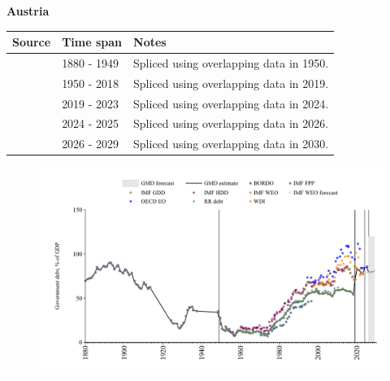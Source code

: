 \documentclass[12pt,a4paper,landscape]{article}
\begin{document}
\begin{adjustbox}{max totalsize={\paperwidth}{\paperheight},center}
\begin{minipage}[t][\textheight][t]{\textwidth}
\vspace*{0.5cm}
{}
\begin{center}
{\Large\bfseries Austria}
\end{center}
\vspace{0.5cm}
\begin{table}[H]
\centering
\small
\begin{tabular}{|l|l|l|}
\hline
\textbf{Source} & \textbf{Time span} & \textbf{Notes} \\
\hline
\rowcolor{white}\cite{IMF_FPP}& 1880 - 1949 &Spliced using overlapping data in 1950.\\
\rowcolor{lightgray}\cite{IMF_GDD}& 1950 - 2018 &Spliced using overlapping data in 2019.\\
\rowcolor{white}\cite{IMF_FPP}& 2019 - 2023 &Spliced using overlapping data in 2024.\\
\rowcolor{lightgray}\cite{OECD_EO}& 2024 - 2025 &Spliced using overlapping data in 2026.\\
\rowcolor{white}\cite{IMF_WEO_forecast}& 2026 - 2029 &Spliced using overlapping data in 2030.\\
\hline
\end{tabular}
\end{table}
\begin{figure}[H]
\centering
\includegraphics[width=\textwidth,height=0.6\textheight,keepaspectratio]{graphs/AUT_govdebt_GDP.pdf}
\end{figure}
\end{minipage}
\end{adjustbox}
\end{document}
